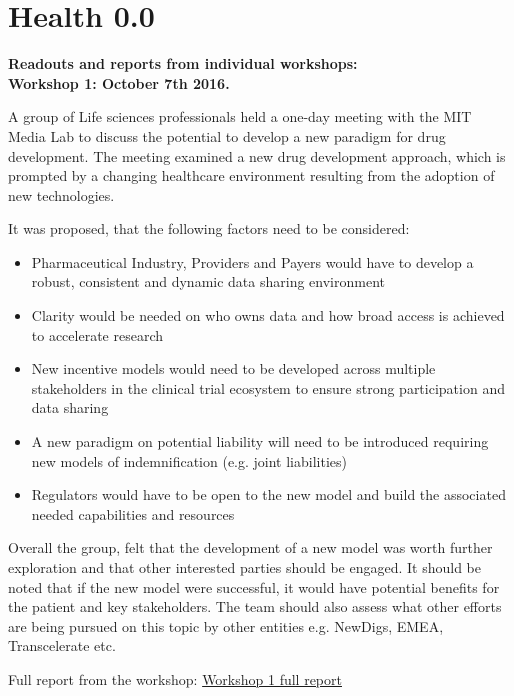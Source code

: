 
\chapter{Health 0.0}
\label{appendix:health}

\textbf{Readouts and reports from individual workshops:} \\

\textbf{Workshop 1: October 7th 2016.}
 
A group of Life sciences professionals held a one-day meeting with the MIT Media Lab to discuss the potential to develop a new paradigm for drug development. The meeting examined a new drug development approach, which is prompted by a changing healthcare environment resulting from the adoption of new technologies.

It was proposed, that the following factors need to be considered:
\begin{itemize}
\item Pharmaceutical Industry, Providers and Payers would have to develop a robust, consistent and dynamic data sharing environment
\item Clarity would be needed on who owns data and how broad access is achieved to accelerate research
\item New incentive models would need to be developed across multiple stakeholders in the clinical trial ecosystem to ensure strong participation and data sharing
\item A new paradigm on potential liability will need to be introduced requiring new models of indemnification (e.g. joint liabilities)
\item Regulators would have to be open to the new model and build the associated needed capabilities and resources
\end{itemize}

Overall the group, felt that the development of a new model was worth further exploration and that other interested parties should be engaged. It should be noted that if the new model were successful, it would have potential benefits for the patient and key stakeholders. The team should also assess what other efforts are being pursued on this topic by other entities e.g. NewDigs, EMEA, Transcelerate etc.

Full report from the workshop: \href{https://drive.google.com/file/d/1kFMbGtNa5IxEZz02Qn8uw-oOeWQ1qIiq/view}{Workshop 1 full report} \\

